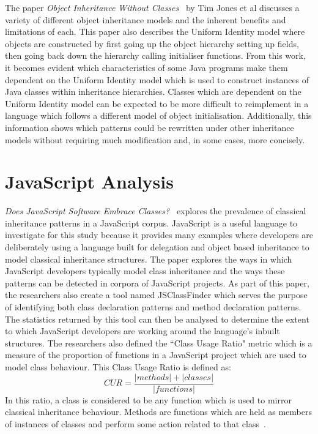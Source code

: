 The paper \textit{Object Inheritance Without Classes~\cite{InheritanceWithoutClasses}} by Tim Jones et al discusses a variety of different object inheritance models and the inherent benefits and limitations of each. This paper also describes the Uniform Identity model where objects are constructed by first going up the object hierarchy setting up fields, then going back down the hierarchy calling initialiser functions. From this work, it becomes evident which characteristics of some Java programs make them dependent on the Uniform Identity model which is used to construct instances of Java classes within inheritance hierarchies. Classes which are dependent on the Uniform Identity model can be expected to be more difficult to reimplement in a language which follows a different model of object initialisation. Additionally, this information shows which patterns could be rewritten under other inheritance models without requiring much modification and, in some cases, more concisely.

\section{JavaScript Analysis}
\textit{Does JavaScript Software Embrace Classes?~\cite{JSClassFinder}} explores the prevalence of classical inheritance patterns in a JavaScript corpus. JavaScript is a useful language to investigate for this study because it provides many examples where developers are deliberately using a language built for delegation and object based inheritance to model classical inheritance structures. The paper explores the ways in which JavaScript developers typically model class inheritance and the ways these patterns can be detected in corpora of JavaScript projects. As part of this paper, the researchers also create a tool named JSClassFinder which serves the purpose of identifying both class declaration patterns and method declaration patterns. The statistics returned by this tool can then be analysed to determine the extent to which JavaScript developers are working around the language's inbuilt structures. The researchers also defined the ``Class Usage Ratio" metric which is a measure of the proportion of functions in a JavaScript project which are used to model class behaviour. This Class Usage Ratio is defined as:
\[CUR = \frac{\left\vert methods \right\vert + \left\vert classes \right\vert}{\left\vert functions \right\vert}\]
In this ratio, a class is considered to be any function which is used to mirror classical inheritance behaviour. Methods are functions which are held as members of instances of classes and perform some action related to that class~\cite{JSClassFinder}.

